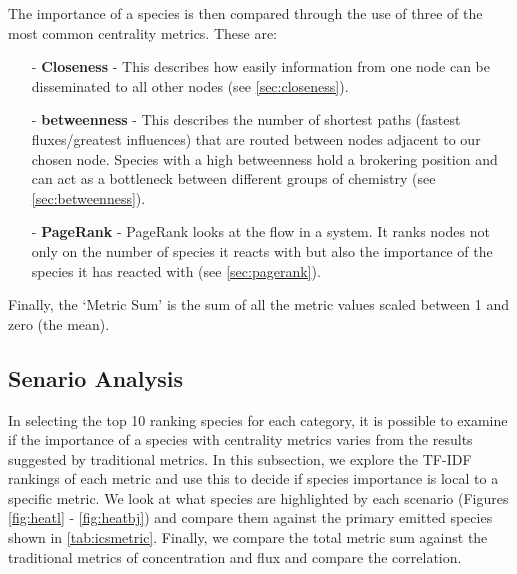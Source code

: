 The importance of a species is then compared through the use of three of the most common centrality metrics. These are:


\begin{itemize}
\item[-] \textbf{Closeness} - This describes how easily information from one node can be disseminated to all other nodes (see \autoref{sec:closeness}).
\item[-] \textbf{ betweenness} - This describes the number of shortest paths (fastest fluxes/greatest influences) that are routed between nodes adjacent to our chosen node. Species with a high betweenness hold a brokering position and can act as a bottleneck between different groups of chemistry (see \autoref{sec:betweenness}).
\item[-] \textbf{PageRank} - PageRank looks at the flow in a system. It ranks nodes not only on the number of species it reacts with but also the importance of the species it has reacted with (see \autoref{sec:pagerank}).

\end{itemize}

Finally, the `Metric Sum' is the sum of all the metric values scaled between 1 and zero (the mean).

\subsection{Senario Analysis}
In selecting the top 10 ranking species for each category, it is possible to examine if the importance of a species with centrality metrics varies from the results suggested by traditional metrics. In this subsection, we explore the TF-IDF rankings of each metric and use this to decide if species importance is local to a specific metric. We look at what species are highlighted by each scenario (Figures \ref{fig:heatl} - \ref{fig:heatbj}) and compare them against the primary emitted species shown in \autoref{tab:icsmetric}. Finally, we compare the total metric sum against the traditional metrics of concentration and flux and compare the correlation.
%
%
%

%


